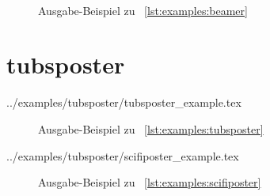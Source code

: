 {    \begin{figure}
    \begin{minipage}{0.49\textwidth}\centering
    \end{minipage}\hfill
    \begin{minipage}{0.49\textwidth}\centering
    \end{minipage}\\[3mm]
    \begin{minipage}{0.49\textwidth}\centering
    \end{minipage}\hfill
    \begin{minipage}{0.49\textwidth}\centering
    \end{minipage}
    \caption{Ausgabe-Beispiel zu \lstlistingname~\ref{lst:examples:beamer}}
    \label{fig:examples:beamer}
  \end{figure}


\clearpage
\section{tubsposter}

    {../examples/tubsposter/tubsposter_example.tex}


  \begin{figure}[!ht]\centering
    \caption{Ausgabe-Beispiel zu \lstlistingname~\ref{lst:examples:tubsposter}}
    \label{fig:examples:tubsposter}
  \end{figure}
  
\clearpage
    {../examples/tubsposter/scifiposter_example.tex}

  \begin{figure}[!ht]\centering
    \caption{Ausgabe-Beispiel zu \lstlistingname~\ref{lst:examples:scifiposter}}
    \label{fig:examples:scifiposter}
  \end{figure}

}
